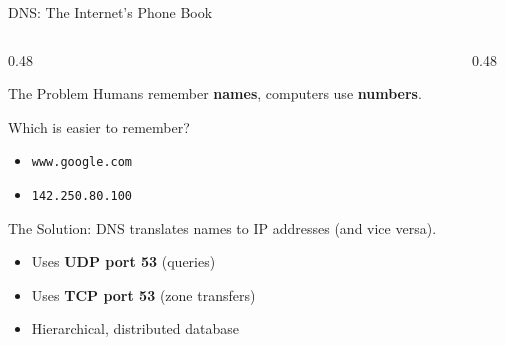 \documentclass[aspectratio=169]{beamer}  %
\begin{document}
\begin{frame}{DNS: The Internet's Phone Book}
    \begin{columns}[T]
        \begin{column}{0.48\textwidth}
            \begin{block}{The Problem}
                \small
                Humans remember \textbf{names}, computers use \textbf{numbers}.
                
                \vspace{0.2em}
                Which is easier to remember?
                \begin{itemize}
                    \item \texttt{www.google.com}
                    \item \texttt{142.250.80.100}
                \end{itemize}
            \end{block}
            
            \vspace{0.2em}
            \begin{block}{The Solution: DNS}
                \small
                 translates names to IP addresses (and vice versa).
                
                \vspace{0.2em}
                \begin{itemize}\setlength{\itemsep}{1pt}
                    \item Uses \textbf{UDP port 53} (queries)
                    \item Uses \textbf{TCP port 53} (zone transfers)
                    \item Hierarchical, distributed database
                \end{itemize}
            \end{block}
        \end{column}
        \begin{column}{0.48\textwidth}
            \begin{center}
\end{center}
\end{column}
\end{columns}
\end{frame}
\end{document}
